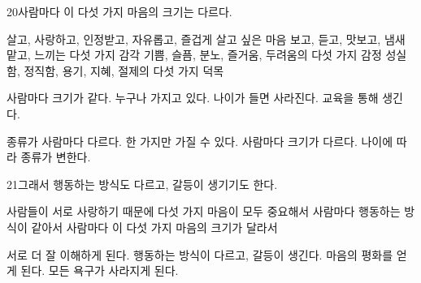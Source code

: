 \documentclass[fs85,seriesRus]{korfarm-base}
\begin{document}
\begin{kfSentenceUnit}{20}{사람마다 이 다섯 가지 마음의 크기는 다르다.}
\begin{kfChoices}
\kfChoice 살고, 사랑하고, 인정받고, 자유롭고, 즐겁게 살고 싶은 마음
\kfChoice 보고, 듣고, 맛보고, 냄새 맡고, 느끼는 다섯 가지 감각
\kfChoice 기쁨, 슬픔, 분노, 즐거움, 두려움의 다섯 가지 감정
\kfChoice 성실함, 정직함, 용기, 지혜, 절제의 다섯 가지 덕목
\end{kfChoices}
\begin{kfChoices}
\kfChoice 사람마다 크기가 같다.
\kfChoice 누구나 가지고 있다.
\kfChoice 나이가 들면 사라진다.
\kfChoice 교육을 통해 생긴다.
\end{kfChoices}
\begin{kfChoices}
\kfChoice 종류가 사람마다 다르다.
\kfChoice 한 가지만 가질 수 있다.
\kfChoice 사람마다 크기가 다르다.
\kfChoice 나이에 따라 종류가 변한다.
\end{kfChoices}
\end{kfSentenceUnit}

\begin{kfSentenceUnit}{21}{그래서 행동하는 방식도 다르고, 갈등이 생기기도 한다.}
\begin{kfChoices}
\kfChoice 사람들이 서로 사랑하기 때문에
\kfChoice 다섯 가지 마음이 모두 중요해서
\kfChoice 사람마다 행동하는 방식이 같아서
\kfChoice 사람마다 이 다섯 가지 마음의 크기가 달라서
\end{kfChoices}
\begin{kfChoices}
\kfChoice 서로 더 잘 이해하게 된다.
\kfChoice 행동하는 방식이 다르고, 갈등이 생긴다.
\kfChoice 마음의 평화를 얻게 된다.
\kfChoice 모든 욕구가 사라지게 된다.
\end{kfChoices}
\end{kfSentenceUnit}
\end{document}
